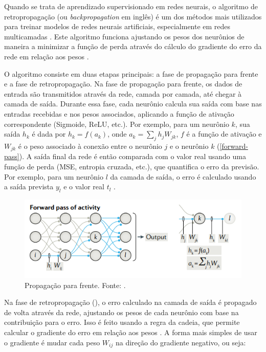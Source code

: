 Quando se trata de aprendizado supervisionado em redes neurais, o algoritmo de retropropagação (ou \textit{backpropagation} em inglês) é um dos métodos mais utilizados para treinar modelos de redes neurais artificiais, especialmente em redes multicamadas \citep{Sarker2021}. Este algoritmo funciona ajustando os pesos dos neurônios de maneira a minimizar a função de perda através do cálculo do gradiente do erro da rede em relação aos pesos \citep{AurlienGron2019}.

O algoritmo consiste em duas etapas principais: a fase de propagação para frente e a fase de retropropagação. Na fase de propagação para frente, os dados de entrada são transmitidos através da rede, camada por camada, até chegar à camada de saída. Durante essa fase, cada neurônio calcula sua saída com base nas entradas recebidas e nos pesos associados, aplicando a função de ativação correspondente (Sigmoide, ReLU, etc.). Por exemplo, para um neurônio $k$, sua saída $h_k$ é dada por $h_k = f(a_k)$, onde $a_k = \sum_{j} h_j W_{jk}$, $f$ é a função de ativação e $W_{jk}$ é o peso associado à conexão entre o neurônio $j$ e o neurônio $k$ (\autoref{forward-pass}). A saída final da rede é então comparada com o valor real usando uma função de perda (MSE, entropia cruzada, etc.), que quantifica o erro da previsão. Por exemplo, para um neurônio $l$ da camada de saída, o erro é calculado usando a saída prevista $y_l$ e o valor real $t_l$ \citep{Lillicrap2020}.

\begin{figure}[h]
    \centering
    \includegraphics[width=\linewidth]{figs/forward-pass.png}
    \caption{Propagação para frente. Fonte: \cite{Lillicrap2020}.}
    \label{forward-pass}
\end{figure}

Na fase de retropropagação (), o erro calculado na camada de saída é propagado de volta através da rede, ajustando os pesos de cada neurônio com base na contribuição para o erro. Isso é feito usando a regra da cadeia, que permite calcular o gradiente do erro em relação aos pesos \citep{AurlienGron2019}. A forma mais simples de usar o gradiente é mudar cada peso $W_{ij}$ na direção do gradiente negativo, ou seja:

